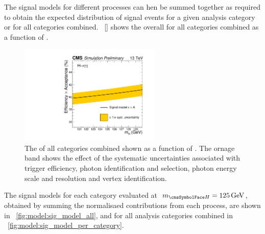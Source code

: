 The signal models for different processes can hen be summed together as required to obtain the expected \mgg distribution of signal events for a given analysis category or for all categories combined. \Fig~\ref{} shows the overall \effxacc for all categories combined as a function of \mH.

\begin{figure}[ht!]
\centering
\includegraphics[width=0.6\textwidth]{modellingFigures/effAcc_vs_mass.pdf} 
\caption{The \effxacc of all categories combined shown as a function of \mH. The ornage band shows the effect of the systematic uncertainties associated with trigger efficiency, photon identification and selection, photon energy scale and resolution and vertex identification.}

\label{fig:model:sig_effxacc}
\end{figure}

The signal models for each category evaluated at $\mH=125\GeV$, obtained by summing the normalisaed contributions from each process, are shown in \Fig~\ref{fig:model:sig_model_all}, and for all analysis categories combined in \Fig~\ref{fig:model:sig_model_per_category}. 


